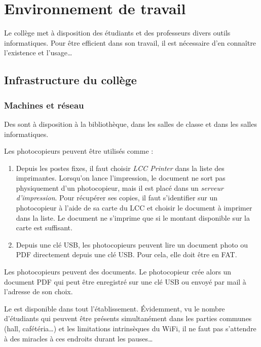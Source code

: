 \documentclass[10pt,a4paper]{report}
\begin{document}
\chapterFormat




\chapter*{Environnement de travail}

Le collège met à disposition des étudiants et des professeurs divers outils informatiques. Pour être efficient dans son travail, il est nécessaire d'en connaître l'existence et l'usage\dots





\section{Infrastructure du collège}



\subsection{Machines et réseau}

Des  sont à disposition à la bibliothèque, dans les salles de classe et dans les salles informatiques.

Les photocopieurs peuvent être utilisés comme  : 
\begin{enumerate}
	\item Depuis les postes fixes, il faut choisir \emph{LCC Printer} dans la liste des imprimantes. Lorsqu'on lance l'impression, le document ne sort pas physiquement d'un photocopieur, mais il est placé dans un \emph{serveur d'impression}. Pour récupérer ses copies, il faut s'identifier sur un photocopieur à l'aide de sa carte du LCC et choisir le document à imprimer dans la liste. Le document ne s'imprime que si le montant disponible sur la carte est suffisant.
	\item Depuis une clé USB, les photocopieurs peuvent lire un document photo ou PDF directement depuis une clé USB. Pour cela, elle doit être  en FAT.
\end{enumerate} 

Les photocopieurs peuvent  des documents. Le photocopieur crée alors un document PDF qui peut être enregistré sur une clé USB ou envoyé par mail à l'adresse de son choix.

Le  est disponible dans tout l'établissement. Évidemment, vu le nombre d'étudiants qui peuvent être présents simultanément dans les parties communes (hall, cafétéria\dots) et les limitations intrinsèques du WiFi, il ne faut pas s'attendre à des miracles à ces endroits durant les pauses\dots
\end{document}
